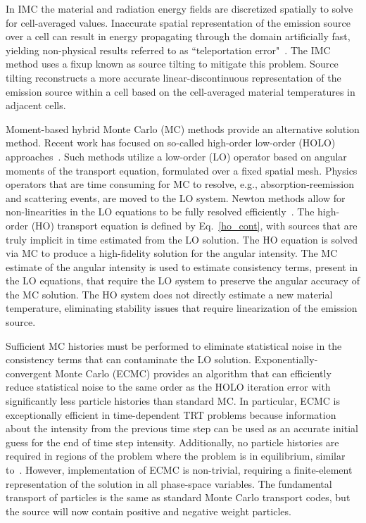 \documentclass{mc2013}
\begin{document}
In IMC the material and radiation energy fields are discretized spatially to solve for cell-averaged values.
Inaccurate spatial representation of the emission source over a cell can result in
energy propagating through the domain artificially fast, yielding non-physical
results referred to as ``teleportation error"~\cite{teleportation}.  The IMC method uses a fixup known as source tilting
to mitigate this problem.  Source tilting reconstructs a more accurate
linear-discontinuous representation of the
emission source within a cell based on the cell-averaged material temperatures in adjacent
cells. 

Moment-based hybrid Monte Carlo (MC) methods provide an alternative solution method.
Recent work has focused on so-called high-order low-order (HOLO)
approaches~\cite{willert,park,rmc,ans_2014}.  Such methods utilize a low-order (LO)
operator based on angular moments of the transport equation, formulated over a fixed
spatial mesh. Physics operators that are time consuming for MC
to resolve, e.g., absorption-reemission and scattering events, are moved to the LO
system.  Newton methods allow for non-linearities in the LO equations to be fully
resolved efficiently~\cite{willert}.  The high-order (HO) transport equation is defined by 
Eq.~\eqref{ho_cont}, with sources that are truly implicit in time estimated from the LO solution. The HO equation is solved via MC to produce a high-fidelity solution for
the angular intensity.  The MC estimate of the angular intensity is used to estimate consistency terms,
present in the LO equations, that require the LO system to preserve the angular accuracy of the
MC solution.  The HO system does not directly estimate a new material temperature,
eliminating stability issues that require linearization of the emission source.

Sufficient MC histories must be performed to eliminate statistical
noise in the consistency terms that can contaminate the LO solution.
Exponentially-convergent Monte Carlo (ECMC)\cite{ecmc} provides an algorithm that can efficiently
reduce statistical noise to the same order as the HOLO iteration error with
significantly less particle histories than standard MC. In particular, ECMC is
exceptionally efficient in time-dependent TRT problems because information about the
intensity from the previous time step can be used as an accurate initial guess for
the end of time step intensity. Additionally, no particle histories are required in regions of the problem
where the problem is in equilibrium, similar to~\cite{rmc}.  However, implementation
of ECMC is non-trivial, requiring a finite-element representation of the solution in all
phase-space variables.  The fundamental transport of particles is the same
as standard Monte Carlo transport codes, but the source will now contain positive and
negative weight particles.
\end{document}
